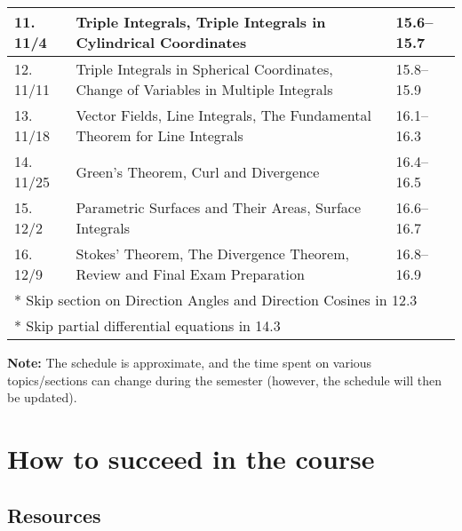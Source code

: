 \documentclass[oneside,11pt]{amsart}
\begin{document}
\begin{center}
\begin{longtable}{|l|p{}|l|}
    \hline
    11. 11/4 & Triple Integrals, Triple Integrals in Cylindrical Coordinates & 15.6--15.7 \\
    \hline
    12. 11/11 & Triple Integrals in Spherical Coordinates, Change of Variables in Multiple Integrals & 15.8--15.9 \\
    \hline
    13. 11/18 & Vector Fields, Line Integrals, The Fundamental Theorem for Line Integrals & 16.1--16.3 \\
    \hline
    14. 11/25 & Green's Theorem, Curl and Divergence & 16.4--16.5 \\
    \hline
    15. 12/2 & Parametric Surfaces and Their Areas, Surface Integrals & 16.6--16.7 \\
    \hline
    16. 12/9 & Stokes' Theorem, The Divergence Theorem, Review and Final Exam Preparation & 16.8--16.9 \\
    \hline
    \multicolumn{3}{l}{* Skip section on Direction Angles and Direction Cosines in 12.3}\\
	\multicolumn{3}{l}{* Skip partial differential equations in 14.3} \\
\end{longtable}
\end{center}

\vspace{5pt}

\textbf{Note:} The schedule is approximate, and the time spent on various topics/sections can change during the semester (however, the schedule will then be updated).

\section{How to succeed in the course}

\subsection{Resources}
\end{document}
